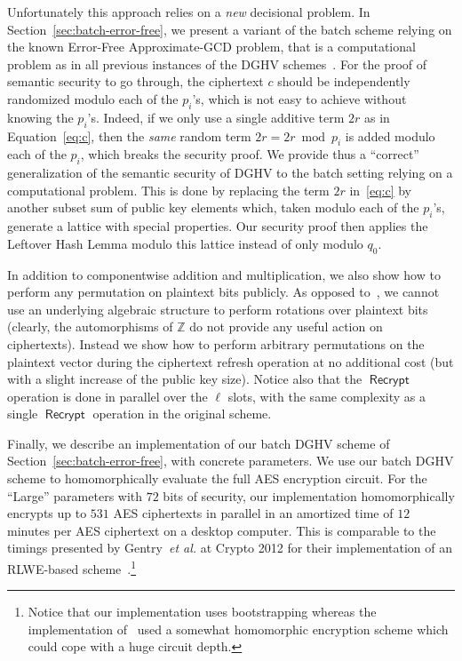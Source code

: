 \documentclass[11pt]{llncs}
\newcommand{\etal}{\textsl{et al.}\xspace}
\newcommand{\Z}{{\mathbb Z}}
\DeclareMathOperator{\Recrypt}{\ensuremath{\mathsf{Recrypt}}}
\begin{document}
Unfortunately this approach relies on a \emph{new} decisional problem. In 
Section~\ref{sec:batch-error-free}, we present a variant of the batch 
scheme relying on the known Error-Free Approximate-GCD problem, that is a 
computational problem as in all previous instances of the DGHV 
schemes~\cite{vDGHV2010,CMNT2011,CNT2012}. For the proof of semantic 
security to go through, the ciphertext $c$
should be independently randomized modulo each of the $p_i$'s, which is not 
easy to achieve without knowing the $p_i$'s. Indeed, if we only use a 
single additive term $2r$ as in Equation~\eqref{eq:c}, then the \emph{same} random 
term $2r=2r \bmod p_i$ is added modulo each of the $p_i$, which breaks 
the security proof. We provide thus a ``correct'' generalization of the 
semantic security of DGHV to the batch setting relying on a computational 
problem. This is
done by replacing the term $2r$ in~\eqref{eq:c} by another subset sum of public key elements which, taken
modulo each of the $p_i$'s, generate a lattice with special properties.
Our security proof then applies the Leftover Hash Lemma modulo this
lattice instead of only modulo $q_0$.

In addition to componentwise addition and multiplication, we also show
how to perform any permutation on plaintext bits publicly. As opposed
to~\cite{BGV2012,GHS2012a}, we cannot use an underlying algebraic
structure to perform rotations over plaintext bits (clearly, the
automorphisms of $\Z$ do not provide any useful action on ciphertexts).
Instead we show how to perform arbitrary permutations on the plaintext
vector during the ciphertext refresh operation at no additional cost (but with
a slight increase of the public key size). Notice also that the $\Recrypt$
operation is done in parallel over the 
$\ell$ slots, with the same complexity as a single $\Recrypt$
operation in the original scheme.

Finally, we describe an implementation of our batch DGHV scheme of Section~\ref{sec:batch-error-free}, with
concrete parameters. We use our batch DGHV scheme to homomorphically
evaluate the full AES encryption circuit. For the ``Large'' parameters
with $72$ bits of security, our implementation  homomorphically
encrypts up to  $531$ AES ciphertexts in parallel in an amortized time of $12$
minutes per AES ciphertext on a desktop computer. This is comparable to
the timings presented by Gentry~\etal at Crypto 2012 for their
implementation of an RLWE-based scheme~\cite{GHS2012c}.\footnote{
Notice that our implementation uses bootstrapping whereas the implementation
of~\cite{GHS2012c} used a somewhat homomorphic encryption scheme which
could cope with a huge circuit depth. }
\end{document}
